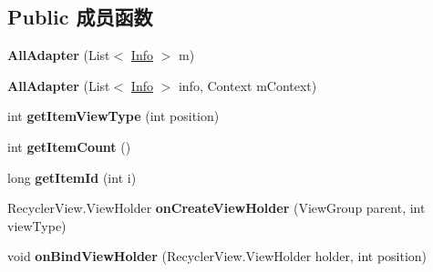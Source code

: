 \subsection*{Public 成员函数}
\begin{DoxyCompactItemize}
\item 
\mbox{\label{classcom_1_1example_1_1twitter_1_1_all_adapter_a09fa59374d29e4d4de648c5788e65273}} 
{\bfseries All\+Adapter} (List$<$ \mbox{\hyperlink{classcom_1_1example_1_1twitter_1_1_info}{Info}} $>$ m)
\item 
\mbox{\label{classcom_1_1example_1_1twitter_1_1_all_adapter_aad86cd2c3a79834463a3179b5582086c}} 
{\bfseries All\+Adapter} (List$<$ \mbox{\hyperlink{classcom_1_1example_1_1twitter_1_1_info}{Info}} $>$ info, Context m\+Context)
\item 
\mbox{\label{classcom_1_1example_1_1twitter_1_1_all_adapter_a55e7d55ff1b270000b5dabd51672a1a3}} 
int {\bfseries get\+Item\+View\+Type} (int position)
\item 
\mbox{\label{classcom_1_1example_1_1twitter_1_1_all_adapter_af661754290d5d9d51f263dc0634ab627}} 
int {\bfseries get\+Item\+Count} ()
\item 
\mbox{\label{classcom_1_1example_1_1twitter_1_1_all_adapter_aa5766970d05f4143eff7e165f067396a}} 
long {\bfseries get\+Item\+Id} (int i)
\item 
\mbox{\label{classcom_1_1example_1_1twitter_1_1_all_adapter_a001d6771db4b45d6a33974e1c2d2485c}} 
Recycler\+View.\+View\+Holder {\bfseries on\+Create\+View\+Holder} (View\+Group parent, int view\+Type)
\item 
\mbox{\label{classcom_1_1example_1_1twitter_1_1_all_adapter_aea893abefedfccc0d6bf726c3ac2263a}} 
void {\bfseries on\+Bind\+View\+Holder} (Recycler\+View.\+View\+Holder holder, int position)
\end{DoxyCompactItemize}
